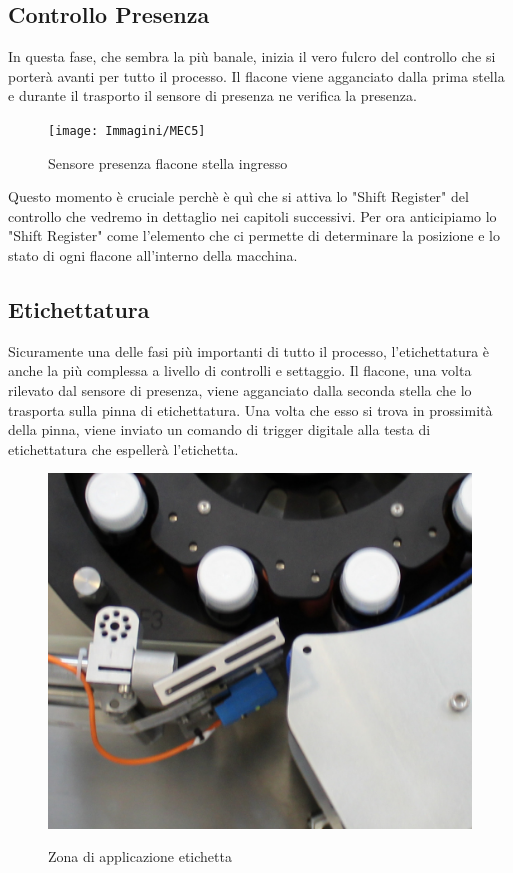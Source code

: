 \documentclass[12pt, a4paper, oneside]{book}
\begin{document}
\subsection{Controllo Presenza}
In questa fase, che sembra la più banale, inizia il vero fulcro del controllo che si porterà avanti per tutto il processo. Il flacone viene agganciato dalla prima stella e durante il trasporto il sensore di presenza ne verifica la presenza. 

\begin{figure}[H]
	\centering
	\texttt{[image: Immagini/MEC5]}
	\label{mec5}
	\caption{ Sensore presenza flacone stella ingresso}
\end{figure}

Questo momento è cruciale perchè è quì che si attiva lo "Shift Register" del controllo che vedremo in dettaglio nei capitoli successivi. Per ora anticipiamo lo "Shift Register" come l'elemento che ci permette di determinare la posizione e lo stato di ogni flacone all'interno della macchina.




\subsection{Etichettatura}
Sicuramente una delle fasi più importanti di tutto il processo, l'etichettatura è anche la più complessa a livello di controlli e settaggio. Il flacone, una volta rilevato dal sensore di presenza, viene agganciato dalla seconda stella che lo trasporta sulla pinna di etichettatura. Una volta che esso si trova in prossimità della pinna, viene inviato un comando di trigger digitale alla testa di etichettatura che espellerà l'etichetta. 

\begin{figure}[H]
	\centering
	\includegraphics[width=12cm]{Immagini/MEC6}
	\label{mec6}
	\caption{ Zona di applicazione etichetta }
\end{figure}
\end{document}
